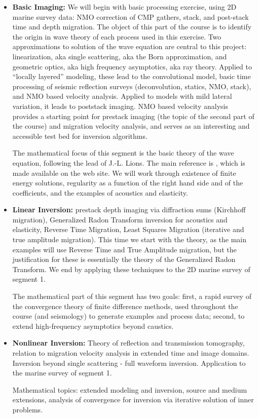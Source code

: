 \begin{itemize}
\item {\bf Basic Imaging:} We will begin with basic processing exercise, using 2D marine survey data: NMO correction of CMP gathers, stack, and post-stack time and depth migration. The object of this part of the course is to identify the origin in wave theory of each process used in this exercise. Two approximations to solution of the wave equation are central to this project: linearization, aka single scattering, aka the Born approximation, and geometric optics, aka high frequency asymptotics, aka ray theory. Applied to ``locally layered'' modeling, these lead to the convolutional model, basic time processing of seismic reflection surveys (deconvolution, statics, NMO, stack), and NMO based velocity analysis. Applied to models with mild lateral variation, it leads to poststack imaging. NMO based velocity analysis provides a starting point for prestack imaging (the topic of the second part of the course) and migration velocity analysis, and serves as an interesting and accessible test bed for inversion algorithms.  

The mathematical focus of this segment is the basic theory of the wave equation, following the lead of J.-L. Lions. The main reference is \cite{BlazekStolkSymes:13}, which is made available on the web site. We will work through existence of finite energy solutions, regularity as a function of the right hand side and of the coefficients, and the examples of acoustics and elasticity.

\item {\bf Linear Inversion:} prestack depth imaging via diffraction sums (Kirchhoff migration), Generalized Radon Transform inversion for acoustics and elasticity, Reverse Time Migration, Least Squares Migration (iterative and true amplitude migration). This time we start with the theory, as the main examples will use Reverse Time and True Amplitude migration, but the justification for these is essentially the theory of the Generalized Radon Transform. We end by applying these techniques to the 2D marine survey of segment 1.

The mathematical part of this segment has two goals: first, a rapid survey of the convergence theory of finite difference methods, used throughout the course (and seismology) to generate examples and process data; second, to extend high-frequency asymptotics beyond caustics. 

\item {\bf Nonlinear Inversion:} Theory of reflection and transmission tomography, relation to migration velocity analysis in extended time and image domains. Inversion beyond single scattering - full waveform inversion.  Application to the marine survey of segment 1. 

Mathematical topics: extended modeling and inversion, source and medium extensions, analysis of convergence for inversion via iterative solution of inner problems. 
\end{itemize}

